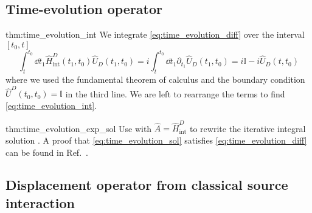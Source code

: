 \subsection{Time-evolution operator}

\begin{delayedproof}{thm:time_evolution_int}
	We integrate \cref{eq:time_evolution_diff} over the interval $[t_0,t]$
	\begin{equation}
		\int_t^{t_0}\dd{t_1}
		\hat{H}_\text{int}^D(t_1,t_0)
		\hat{U}_D(t_1,t_0)
		=
		i\int_t^{t_0}\dd{t_1}
		\partial_{t_1}
		\hat{U}_D(t_1,t_0)
		=
		i\mathbb{I}
		-
		i\hat{U}_D(t,t_0)
	\end{equation}
	where we used the fundamental theorem of calculus and the boundary condition $\hat{U}^D(t_0,t_0)=\mathbb{I}$ in the third line.
	We are left to rearrange the terms to find \cref{eq:time_evolution_int}.
\end{delayedproof}

\begin{delayedproof}{thm:time_evolution_exp_sol}
	Use  with $\hat{A}=\hat{H}_\text{int}^D$ to rewrite the iterative integral solution .
	A proof that \cref{eq:time_evolution_sol} satisfies \cref{eq:time_evolution_diff} can be found in Ref.~\cite[p.~219]{Greiner2013}.
\end{delayedproof}

\subsection{Displacement operator from classical source interaction}

